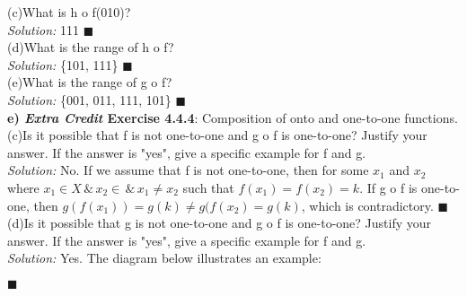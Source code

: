 \documentclass[11pt]{article}
\begin{document}
		(c)What is h o f(010)? \\
		\textit{Solution: } 111 $\blacksquare$ \\
				 
		(d)What is the range of h o f? \\
		\textit{Solution: }  \{101, 111\} $\blacksquare$ \\		
		
		(e)What is the range of g o f? \\
		\textit{Solution: }  \{001, 011, 111, 101\} $\blacksquare$ \\
		
	\newpage
		\textbf{e) \emph{Extra Credit} Exercise 4.4.4}: Composition of onto and one-to-one functions. \\		
		
		(c)Is it possible that f is not one-to-one and g o f is one-to-one? Justify your answer. If the answer is "yes", give a specific example for f and g. \\
		\textit{Solution: } 
		No.  If we assume that f is not one-to-one, then for some $x_1$ and $x_2$ 
		where $x_1 \in X \, \& \, x_2 \in \, \& \, x_1 \neq x_2$  such that $f(x_1)=f(x_2)=k$. 
		If g o f is one-to-one, then $g(f(x_1)) = g(k) \neq g(f(x_2) = g(k)$, which is contradictory. $\blacksquare$ \\
		

		
		(d)Is it possible that g is not one-to-one and g o f is one-to-one? Justify your answer. If the answer is "yes", give a specific example for f and g. \\
		\textit{Solution: }
		Yes. The diagram below illustrates an example:	 \\
		\begin{center}
		 $\blacksquare$ 
		\end{center}
		
	
\end{document}
